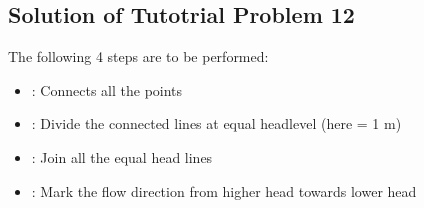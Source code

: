 \documentclass[letterpaper,10pt,english]{sphinxmanual}
\begin{document}
\subsection{Solution of Tutotrial Problem 12}
\label{\detokenize{contents/tutorials/tutorial_05/tutorial_05:solution-of-tutotrial-problem-12}}
The following 4 steps are to be performed:
\begin{itemize}
\item {} 
   : Connects all the points

\item {} 
  : Divide the connected lines at equal head\sphinxhyphen{}level (here = 1 m)

\item {} 
 : Join all the equal head lines

\item {} 
  : Mark the flow direction from higher head towards lower head

\end{itemize}
\end{document}
